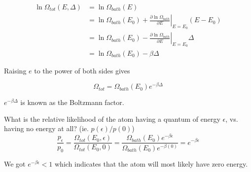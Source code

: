 \documentclass[12pt, a4paper]{article}
\newcounter{exa}
\begin{document}
\begin{align*}
\ln\Omega_{tot}(E,\Delta)&=\ln\Omega_{bath}(E) \\
&=\ln\Omega_{bath}(E_0)+\left.\frac{\partial \ln\Omega_{bath}}{\partial E}\right\vert_{E=E_0}(E-E_0) \\
&=\ln\Omega_{bath}(E_0)-\left.\frac{\partial \ln\Omega_{bath}}{\partial E}\right\vert_{E=E_0}\Delta \\
&=\ln\Omega_{bath}(E_0)-\beta\Delta
\end{align*}

Raising $e$ to the power of both sides gives

$$\boxed{\Omega_{tot}=\Omega_{bath}(E_0)e^{-\beta\Delta}}$$

$e^{-\beta\Delta}$ is known as the Boltzmann factor.

\begin{texample}
What is the relative likelihood of the atom having a quantum of energy $\epsilon$, vs. having no energy at all? (ie. $p(\epsilon)/p(0)$) \\

$$\frac{p_\epsilon}{p_0}=\frac{\Omega_{tot}(E_0,\epsilon)}{\Omega_{tot}(E_0,0)}=\frac{\Omega_{bath}(E_0)e^{-\beta\epsilon}}{\Omega_{bath}(E_0)e^{-\beta(0)}}=e^{-\beta\epsilon}$$

We got $e^{-\beta\epsilon}<1$ which indicates that the atom will most likely have zero energy.
\end{texample}
\end{document}

